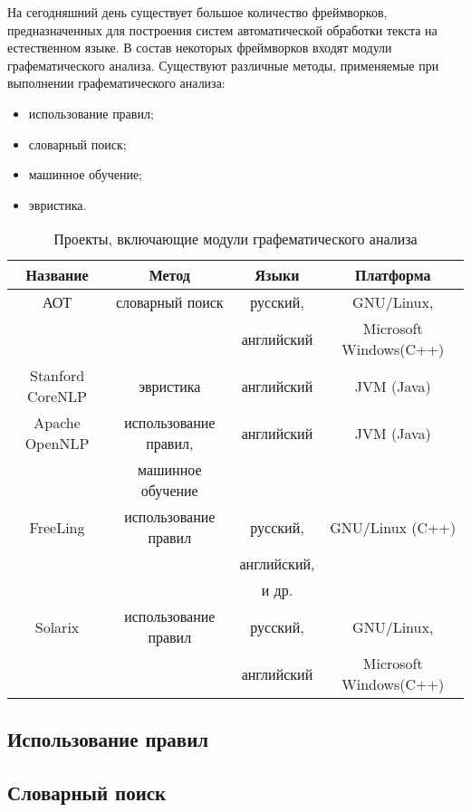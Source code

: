 На сегодняшний день существует большое количество фреймворков, предназначенных для построения систем автоматической обработки текста на естественном языке. В состав некоторых фреймворков входят модули графематического анализа. Существуют различные методы, применяемые при выполнении графематического анализа:
\begin{itemize}
\item
использование правил;
\item
словарный поиск;
\item
машинное обучение;
\item
эвристика.
\end{itemize}

\begin{table}[H] \small
	\centering
	\label{t:thyp_gd1}
	\begin{tabular}{ | c | c | c | c |}
		\hline
		Название 							& Метод 				& Языки 		& Платформа 				\\ \hline
		АОТ\cite{web.aot}					& словарный поиск		& русский,		& GNU/Linux,			\\
											&						& английский	& Microsoft Windows(C++)\\ \hline
		Stanford CoreNLP\cite{web.corenlp}	& эвристика				& английский	& JVM (Java)			\\ \hline
		Apache OpenNLP\cite{web.opennlp}	& использование правил,	& английский	& JVM (Java)			\\
											& машинное обучение		& 				&						\\ \hline
		FreeLing\cite{web.freeling}			& использование правил	& русский,		& GNU/Linux (C++)		\\
											&						& английский,	&						\\
											&						& и др.			&						\\ \hline
		Solarix\cite{web.solarix}			& использование правил	& русский,		& GNU/Linux,			\\ 
											&						& английский	& Microsoft Windows(C++)\\
		\hline
	\end{tabular}
	\caption{Проекты, включающие модули графематического анализа}
\end{table}

\subsection{Использование правил}
\subsection{Словарный поиск}
